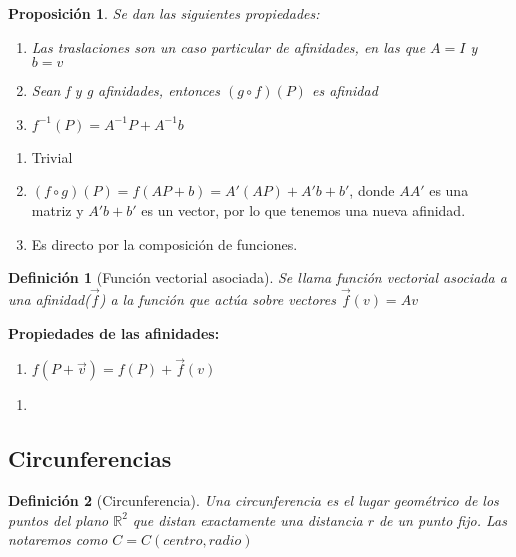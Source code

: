 \documentclass[11pt, a4paper, titlepage]{article}
\makeatletter
\renewenvironment{proof}[1][\proofname] {\vspace{-15pt}\par\pushQED{\qed}\normalfont\topsep6\p@\@plus6\p@\relax\trivlist\item[\hskip\labelsep\it#1\@addpunct{.}]\ignorespaces}{\popQED\endtrivlist\@endpefalse}
\newcommand{\R}{\mathbb{R}}
\renewcommand{\vec}{\overrightarrow}
\theoremstyle{theorem-style}
\newtheorem*{nprop}{Proposición}
\theoremstyle{definition-style}
\newtheorem*{ndef}{Definición}
\theoremstyle{remark-style}
\theoremstyle{example-style}
\newenvironment{nlist}
{\begin{enumerate}
\renewcommand\labelenumi{(\emph{\roman{enumi})}}}
{\end{enumerate}}
\makeatother
\begin{document}
\begin{nprop}
Se dan las siguientes propiedades:
\begin{nlist}
	\item Las traslaciones son un caso particular de afinidades, en las que $A = I$ y $b = v$
	\item Sean f y g afinidades, entonces $(g \circ f) (P)$ es afinidad
	\item $f^{-1}(P) = A^{-1}P +A^{-1}b$
	
\end{nlist}
\end{nprop}
\begin{proof}
	\begin{nlist}
	\item Trivial
	\item $(f\circ g)(P) = f(AP +b) = A'(AP)+A'b +b' $, donde $AA'$ es una matriz y $A'b+b'$ es un vector, por lo que tenemos una nueva afinidad.
	\item Es directo por la composición de funciones.
\end{nlist}
\end{proof}

\begin{ndef}[Función vectorial asociada]
	Se llama función vectorial asociada a una afinidad($\vec{f}$) a la función que actúa sobre vectores $\vec{f}(v) = Av$
\end{ndef}

\textbf{Propiedades de las afinidades:}\\
\begin{enumerate}
	\item $f(P + \vec{v}) = f(P) + \vec{f}(v)$
\end{enumerate}
\begin{proof}\hfill
	\begin{enumerate}
	\item
\end{enumerate}
\end{proof}


\subsection{Circunferencias}

\begin{ndef}[Circunferencia]
	Una circunferencia es el lugar geométrico de los puntos del plano $\R^2$ que distan exactamente una distancia $r$ de un punto fijo. Las notaremos como $C = C(centro,radio)$
\end{ndef}
\end{document}
